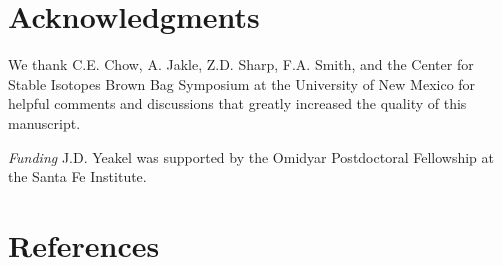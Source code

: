 \documentclass{frontiersSCNS}
\begin{document}
\section*{Acknowledgments}
We thank C.E. Chow, A. Jakle, Z.D. Sharp, F.A. Smith, and the Center for Stable Isotopes Brown Bag Symposium at the University of New Mexico for helpful comments and discussions that greatly increased the quality of this manuscript.


\textit{Funding\textcolon} J.D. Yeakel was supported by the Omidyar Postdoctoral Fellowship at the Santa Fe Institute.


\newpage
\section*{References}

%
\end{document}

